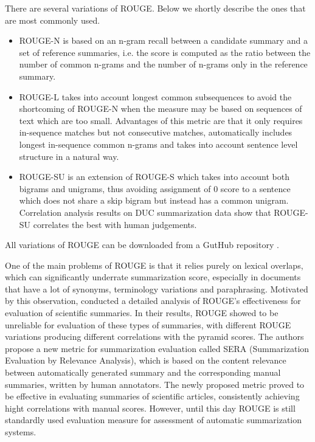 \documentclass[11pt,a4paper,onecolumn]{article}
\begin{document}
There are several variations of ROUGE. Below we shortly describe the ones that are most commonly used.
\begin{itemize}
\item ROUGE-N is based on an n-gram recall between a candidate summary and a set of reference summaries, i.e. the score is computed as the ratio between the number of common n-grams and the number of n-grams only in the reference summary.
\item ROUGE-L takes into account longest common subsequences to avoid the shortcoming of ROUGE-N when the measure may be based on sequences of text which are too small.
Advantages of this metric are that it only requires in-sequence matches but not consecutive matches, automatically includes longest in-sequence common n-grams and takes into account sentence level structure in a natural way.
\item ROUGE-SU is an extension of ROUGE-S which takes into account both bigrams and unigrams, thus avoiding assignment of 0 score to a sentence which does not share a skip bigram but instead has a common unigram.
Correlation analysis results on DUC summarization data show that ROUGE-SU correlates the best with human judgements.
\end{itemize}
All variations of ROUGE can be downloaded from a GutHub repository \cite{rougerepos}.

One of the main problems of ROUGE is that it relies purely on lexical overlaps, which can significantly underrate summarization score, especially in documents that have a lot of synonyms, terminology variations and paraphrasing.
Motivated by this observation, \cite{cohan2016revisiting} conducted a detailed  analysis of ROUGE’s effectiveness for evaluation of scientific summaries.
In their results, ROUGE showed to be unreliable for evaluation of these types of summaries, with different ROUGE variations producing different correlations with the pyramid scores.
The authors propose a new metric for summarization evaluation called SERA (Summarization Evaluation by Relevance Analysis), which is based on the content relevance between automatically generated summary and the corresponding manual summaries, written by human annotators.
The newly proposed metric proved to be effective in evaluating summaries of scientific articles, consistently achieving hight correlations with manual scores.
However, until this day ROUGE is still standardly used evaluation measure for assessment of automatic summarization systems.


%
%



\appendix
\end{document}
